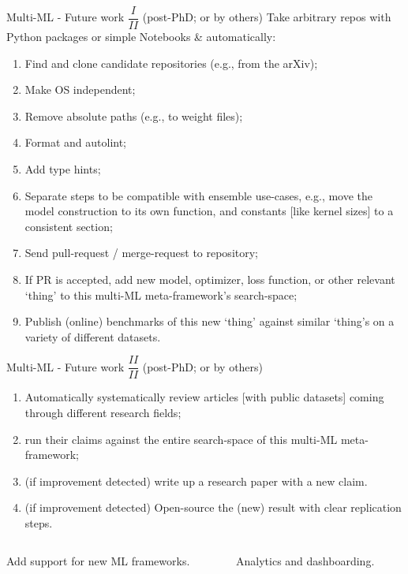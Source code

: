 \documentclass[aspectratio=169,xcolor=dvipsnames]{beamer}
\begin{document}
\begin{frame}{Multi-ML - Future work \(\dfrac{I}{II}\) (post-PhD; or by others)}
	Take arbitrary repos with Python packages or simple Notebooks \& automatically:

	\begin{enumerate}
		\item[0.] Find and clone candidate repositories (e.g., from the arXiv);
		\item Make OS independent;
		\item Remove absolute paths (e.g., to weight files);
		\item Format and autolint;
		\item Add type hints;
		\item Separate steps to be compatible with ensemble use-cases, e.g., move the model construction to its own function, and constants [like kernel sizes] to a consistent section;
		\item Send pull-request / merge-request to repository;
		\item If PR is accepted, add new model, optimizer, loss function, or other relevant `thing' to this multi-ML meta-framework's search-space;
		\item Publish (online) benchmarks of this new `thing' against similar `thing's on a variety of different datasets.
	\end{enumerate}
\end{frame}

\begin{frame}{Multi-ML - Future work \(\dfrac{II}{II}\) (post-PhD; or by others)}
	\begin{enumerate}
		\item[0.] Automatically systematically review articles [with public datasets] coming through different research fields;
		\item run their claims against the entire search-space of this multi-ML meta-framework;
		\item (if improvement detected) write up a research paper with a new claim.
		\item (if improvement detected) Open-source the (new) result with clear replication steps.
	\end{enumerate}
	\vspace{2em}

	\begin{columns}
		\begin{column}[T]{0.4\textwidth}
			Add support for new ML frameworks.
		\end{column}
		\begin{column}[T]{0.4\textwidth}
			Analytics and dashboarding.
		\end{column}
	\end{columns}
\end{frame}
\end{document}
